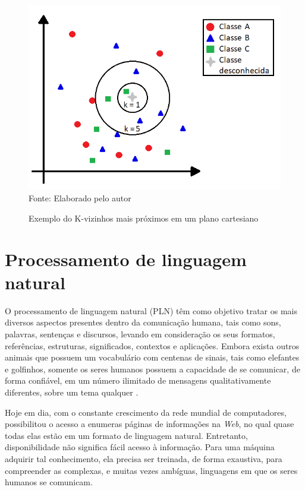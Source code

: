 \begin{figure}[ht!]
\caption{Exemplo do K-vizinhos mais próximos em um plano cartesiano}
\label{fig:knnExample}
\centering
\includegraphics[scale=0.5]{img/knnExample.png}
{\fontsize{11pt}{\baselineskip}\selectfont
\\Fonte: Elaborado pelo autor
}
\end{figure}

\section{Processamento de linguagem natural}
O processamento de linguagem natural (PLN) têm como objetivo tratar os mais diversos aspectos presentes dentro da comunicação humana, tais como sons, palavras, sentenças e discursos, levando em consideração os seus formatos, referências, estruturas, significados, contextos e aplicações. Embora exista outros animais que possuem um vocabulário com centenas de sinais, tais como elefantes e golfinhos, somente os seres humanos possuem a capacidade de se comunicar, de forma confiável, em um número ilimitado de mensagens qualitativamente diferentes, sobre um tema qualquer \citep{russell1994inteligencia, gonzalez2003recuperaccao}.

Hoje em dia, com o constante crescimento da rede mundial de computadores, possibilitou o acesso a enumeras páginas de informações na \textit{Web}, no qual quase todas elas estão em um formato de linguagem natural. Entretanto, disponibilidade não significa fácil acesso à informação. Para uma máquina adquirir tal conhecimento, ela precisa ser treinada, de forma exaustiva, para compreender as complexas, e muitas vezes ambíguas, linguagens em que os seres humanos se comunicam.

